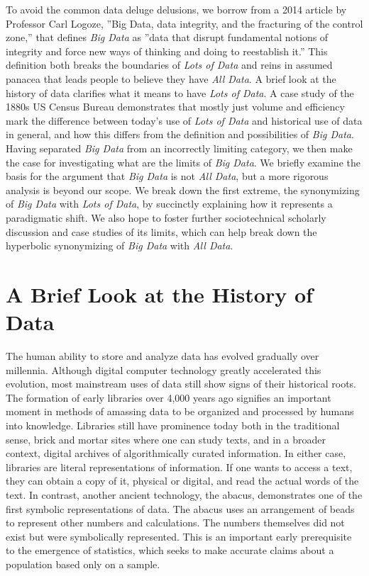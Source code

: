 \documentclass[sigconf]{acmart}
\begin{document}
To avoid the common data deluge delusions, we borrow from a 2014 article by Professor Carl Logoze, ''Big Data, data integrity, and the fracturing of the control zone,'' that defines {\em Big Data} as ''data that disrupt fundamental notions of integrity and force new ways of thinking and doing to reestablish it.''\cite{Keystone} This definition both breaks the boundaries of {\em Lots of Data} and reins in assumed panacea that leads people to believe they have {\em All Data}. A brief look at the history of data clarifies what it means to have {\em Lots of Data}. A case study of the 1880s US Census Bureau demonstrates that mostly just volume and efficiency mark the difference between today's use of {\em Lots of Data} and historical use of data in general, and how this differs from the definition and possibilities of {\em Big Data}. Having separated {\em Big Data} from an incorrectly limiting category, we then make the case for investigating what are the limits of {\em Big Data}. We briefly examine the basis for the argument that {\em Big Data} is not {\em All Data}, but a more rigorous analysis is beyond our scope. We break down the first extreme, the synonymizing of {\em Big Data} with {\em Lots of Data}, by succinctly explaining how it represents a paradigmatic shift. We also hope to foster further sociotechnical scholarly discussion and case studies of its limits, which can help break down the hyperbolic synonymizing of {\em Big Data} with {\em All Data}.

\section{A Brief Look at the History of Data}
The human ability to store and analyze data has evolved gradually over millennia. Although digital computer technology greatly accelerated this evolution, most mainstream uses of data still show signs of their historical roots. The formation of early libraries over 4,000 years ago signifies an important moment in methods of amassing data to be organized and processed by humans into knowledge.\cite{Data_History} Libraries still have prominence today both in the traditional sense, brick and mortar sites where one can study texts, and in a broader context, digital archives of algorithmically curated information. In either case, libraries are literal representations of information. If one wants to access a text, they can obtain a copy of it, physical or digital, and read the actual words of the text.\cite{Keystone} In contrast, another ancient technology, the abacus, demonstrates one of the first symbolic representations of data. The abacus uses an arrangement of beads to represent other numbers and calculations. The numbers themselves did not exist but were symbolically represented. This is an important early prerequisite to the emergence of statistics, which seeks to make accurate claims about a population based only on a sample.\cite{Data_History}
\end{document}
